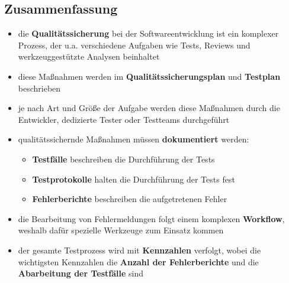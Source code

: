 \subsection*{Zusammenfassung}
\begin{itemize}
    \item die \textbf{Qualitätssicherung} bei der Softwareentwicklung ist ein komplexer Prozess, der u.a. verschiedene Aufgaben wie Tests, Reviews und werkzeuggestützte Analysen beinhaltet
    \item diese Maßnahmen werden im \textbf{Qualitätssicherungsplan} und \textbf{Testplan} beschrieben
    \item je nach Art und Größe  der Aufgabe werden diese Maßnahmen durch die Entwickler, dedizierte Tester oder Testteams durchgeführt
    \item qualitätssichernde Maßnahmen müssen \textbf{dokumentiert} werden:
    \begin{itemize}
        \item \textbf{Testfälle} beschreiben die Durchführung der Tests
        \item \textbf{Testprotokolle} halten die Durchführung der Tests fest
        \item \textbf{Fehlerberichte} beschreiben die aufgetretenen Fehler
    \end{itemize}
    \item die Bearbeitung von Fehlermeldungen folgt einem komplexen \textbf{Workflow}, weshalb dafür spezielle Werkzeuge zum Einsatz kommen
    \item der gesamte Testprozess wird mit \textbf{Kennzahlen} verfolgt, wobei die wichtigsten Kennzahlen die \textbf{Anzahl der Fehlerberichte} und die \textbf{Abarbeitung der Testfälle} sind
\end{itemize}